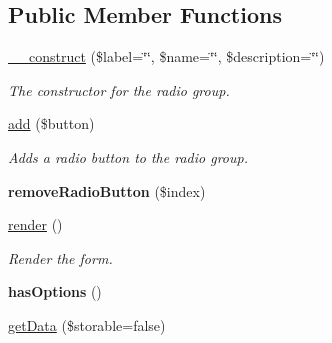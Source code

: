 \subsection*{Public Member Functions}
\begin{DoxyCompactItemize}
\item 
\hypertarget{class_radio_group_a16b486c286cd271ad3c9790648a93748}{
\hyperlink{class_radio_group_a16b486c286cd271ad3c9790648a93748}{\_\-\_\-construct} (\$label=\char`\"{}\char`\"{}, \$name=\char`\"{}\char`\"{}, \$description=\char`\"{}\char`\"{})}
\label{class_radio_group_a16b486c286cd271ad3c9790648a93748}

\begin{DoxyCompactList}\small\item\em The constructor for the radio group. \item\end{DoxyCompactList}\item 
\hypertarget{class_radio_group_a3927b76bb696bf92f39052713155fba6}{
\hyperlink{class_radio_group_a3927b76bb696bf92f39052713155fba6}{add} (\$button)}
\label{class_radio_group_a3927b76bb696bf92f39052713155fba6}

\begin{DoxyCompactList}\small\item\em Adds a radio button to the radio group. \item\end{DoxyCompactList}\item 
\hypertarget{class_radio_group_a1ab6ba37db990d91ce8870b31d42b118}{
{\bfseries removeRadioButton} (\$index)}
\label{class_radio_group_a1ab6ba37db990d91ce8870b31d42b118}

\item 
\hypertarget{class_radio_group_a0ad4e42f4b1721ab1cccb4ae42b693b3}{
\hyperlink{class_radio_group_a0ad4e42f4b1721ab1cccb4ae42b693b3}{render} ()}
\label{class_radio_group_a0ad4e42f4b1721ab1cccb4ae42b693b3}

\begin{DoxyCompactList}\small\item\em Render the form. \item\end{DoxyCompactList}\item 
\hypertarget{class_radio_group_a5d3a1909ce909ca2f5439ed792c24a6e}{
{\bfseries hasOptions} ()}
\label{class_radio_group_a5d3a1909ce909ca2f5439ed792c24a6e}

\item 
\hypertarget{class_radio_group_abf525d5557c95c34f8b23b3c30cd1564}{
\hyperlink{class_radio_group_abf525d5557c95c34f8b23b3c30cd1564}{getData} (\$storable=false)}
\label{class_radio_group_abf525d5557c95c34f8b23b3c30cd1564}


\end{DoxyCompactItemize}

